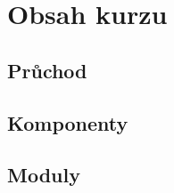 \hypertarget{obsah-kurzu}{%
\chapter{Obsah kurzu}\label{obsah-kurzu}}

\hypertarget{prux16fchod}{%
\section{Průchod}\label{prux16fchod}}

\hypertarget{komponenty}{%
\section{Komponenty}\label{komponenty}}

\hypertarget{moduly}{%
\section{Moduly}\label{moduly}}
